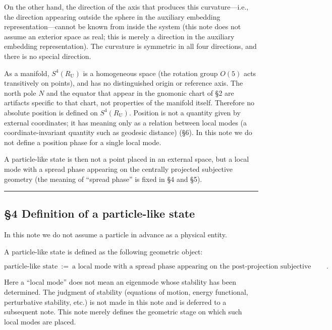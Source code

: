 \documentclass[
]{article}
\begin{document}
On the other hand, the direction of the axis that produces this
curvature---i.e., the direction appearing outside the sphere in the
auxiliary embedding representation---cannot be known from inside the
system (this note does not assume an exterior space as real; this is
merely a direction in the auxiliary embedding representation). The
curvature is symmetric in all four directions, and there is no special
direction.

As a manifold, \(S^4(R_{\mathrm U})\) is a homogeneous space (the
rotation group \(O(5)\) acts transitively on points), and has no
distinguished origin or reference axis. The north pole \(N\) and the
equator that appear in the gnomonic chart of §2 are artifacts specific
to that chart, not properties of the manifold itself. Therefore no
absolute position is defined on \(S^4(R_{\mathrm U})\). Position is not
a quantity given by external coordinates; it has meaning only as a
relation between local modes (a coordinate-invariant quantity such as
geodesic distance) (§6). In this note we do not define a position phase
for a single local mode.

A particle-like state is then not a point placed in an external space,
but a local mode with a spread phase appearing on the centrally
projected subjective geometry (the meaning of ``spread phase'' is fixed
in §4 and §5).

\begin{center}\rule{0.5\linewidth}{0.5pt}\end{center}

\subsection{§4 Definition of a particle-like
state}\label{definition-of-a-particle-like-state}

In this note we do not assume a particle in advance as a physical
entity.

A particle-like state is defined as the following geometric object:

\[\text{particle-like state}\ :=\ \text{a local mode with a spread phase appearing on the post-projection subjective geometry}.\]

Here a ``local mode'' does not mean an eigenmode whose stability has
been determined. The judgment of stability (equations of motion, energy
functional, perturbative stability, etc.) is not made in this note and
is deferred to a subsequent note. This note merely defines the geometric
stage on which such local modes are placed.
\end{document}
